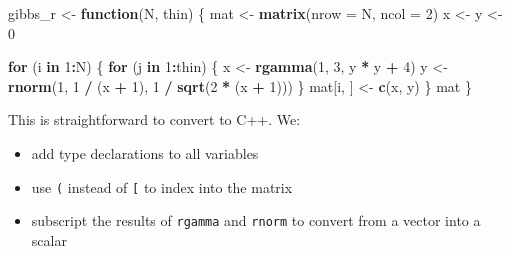 \documentclass[]{book}
\newenvironment{Shaded}{\begin{snugshade}}{\end{snugshade}}
\newcommand{\ControlFlowTok}[1]{\textcolor[rgb]{0.27,0.27,0.27}{\textbf{#1}}}
\newcommand{\DataTypeTok}[1]{\textcolor[rgb]{0.27,0.27,0.27}{#1}}
\newcommand{\DecValTok}[1]{\textcolor[rgb]{0.06,0.06,0.06}{#1}}
\newcommand{\KeywordTok}[1]{\textcolor[rgb]{0.27,0.27,0.27}{\textbf{#1}}}
\newcommand{\NormalTok}[1]{#1}
\newcommand{\OperatorTok}[1]{\textcolor[rgb]{0.43,0.43,0.43}{\textbf{#1}}}
\newcommand{\StringTok}[1]{\textcolor[rgb]{0.5,0.5,0.5}{#1}}
\begin{document}
\begin{Shaded}
\begin{Highlighting}[]
\NormalTok{gibbs_r <-}\StringTok{ }\ControlFlowTok{function}\NormalTok{(N, thin) \{}
\NormalTok{  mat <-}\StringTok{ }\KeywordTok{matrix}\NormalTok{(}\DataTypeTok{nrow =}\NormalTok{ N, }\DataTypeTok{ncol =} \DecValTok{2}\NormalTok{)}
\NormalTok{  x <-}\StringTok{ }\NormalTok{y <-}\StringTok{ }\DecValTok{0}

  \ControlFlowTok{for}\NormalTok{ (i }\ControlFlowTok{in} \DecValTok{1}\OperatorTok{:}\NormalTok{N) \{}
    \ControlFlowTok{for}\NormalTok{ (j }\ControlFlowTok{in} \DecValTok{1}\OperatorTok{:}\NormalTok{thin) \{}
\NormalTok{      x <-}\StringTok{ }\KeywordTok{rgamma}\NormalTok{(}\DecValTok{1}\NormalTok{, }\DecValTok{3}\NormalTok{, y }\OperatorTok{*}\StringTok{ }\NormalTok{y }\OperatorTok{+}\StringTok{ }\DecValTok{4}\NormalTok{)}
\NormalTok{      y <-}\StringTok{ }\KeywordTok{rnorm}\NormalTok{(}\DecValTok{1}\NormalTok{, }\DecValTok{1} \OperatorTok{/}\StringTok{ }\NormalTok{(x }\OperatorTok{+}\StringTok{ }\DecValTok{1}\NormalTok{), }\DecValTok{1} \OperatorTok{/}\StringTok{ }\KeywordTok{sqrt}\NormalTok{(}\DecValTok{2} \OperatorTok{*}\StringTok{ }\NormalTok{(x }\OperatorTok{+}\StringTok{ }\DecValTok{1}\NormalTok{)))}
\NormalTok{    \}}
\NormalTok{    mat[i, ] <-}\StringTok{ }\KeywordTok{c}\NormalTok{(x, y)}
\NormalTok{  \}}
\NormalTok{  mat}
\NormalTok{\}}
\end{Highlighting}
\end{Shaded}

This is straightforward to convert to C++. We:

\begin{itemize}
\item
  add type declarations to all variables
\item
  use \texttt{(} instead of \texttt{{[}} to index into the matrix
\item
  subscript the results of \texttt{rgamma} and \texttt{rnorm} to convert from a vector
  into a scalar
\end{itemize}
\end{document}

